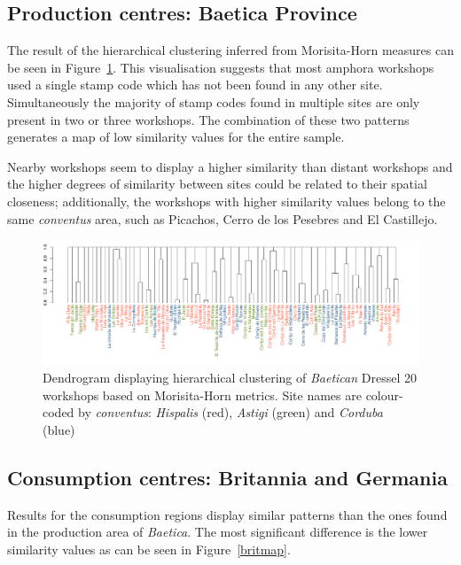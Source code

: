 \subsection{Production centres: Baetica Province}
\label{sec:6}

The result of the hierarchical clustering inferred from Morisita-Horn measures can be seen in Figure~\ref{dendro}. This visualisation suggests that most amphora workshops used a single stamp code which has not been found in any other site. Simultaneously the majority of stamp codes found in multiple sites are only present in two or three workshops. The combination of these two patterns generates a map of low similarity values for the entire sample.

Nearby workshops seem to display a higher similarity than distant workshops and the higher degrees of similarity between sites could be related to their spatial closeness; additionally, the workshops with higher similarity values belong to the same \textit{conventus} area, such as Picachos, Cerro de los Pesebres and El Castillejo.

\begin{figure}[htp]
	\centering
\includegraphics[angle=270, width=0.7\linewidth]{dendro}
\caption{Dendrogram displaying hierarchical clustering of \textit{Baetican} Dressel 20 workshops based on Morisita-Horn metrics. Site names are colour-coded by \textit{conventus}: \textit{Hispalis} (red), \textit{Astigi} (green) and \textit{Corduba} (blue)}
\label{dendro}

\end{figure}

\subsection{Consumption centres: Britannia and Germania}
\label{sec:6}

Results for the consumption regions display similar patterns than the ones found in the production area of \textit{Baetica}. The most significant difference is the lower similarity values as can be seen in Figure~\ref{britmap}.

